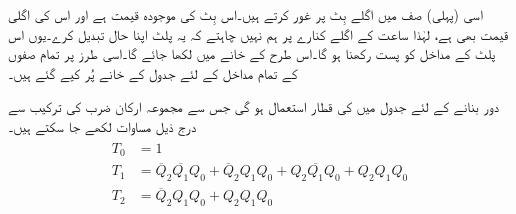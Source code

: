 اسی (پہلی) صف میں اگلے بِٹ  پر غور کرتے ہیں۔اس بِٹ کی موجودہ قیمت  ہے اور اس کی اگلی قیمت بھی  ہے، لہٰذا ساعت کے اگلے کنارے پر ہم نہیں چاہتے کہ یہ پلٹ اپنا حال تبدیل کرے۔یوں اس پلٹ کے مداخل  کو پست رکھنا ہو گا۔اس طرح  کے خانے میں  لکھا جائے گا۔اسی طرز پر تمام صفوں کے تمام مداخل کے لئے جدول کے خانے پُر کیے گئے ہیں۔


دور بنانے کے لئے جدول میں کی قطار استعمال ہو گی جس سے مجموعہ ارکان ضرب کی ترکیب سے درج ذیل مساوات لکھے جا سکتے ہیں۔
\begin{gather}
\begin{aligned}
T_0&=1\\
T_1&=\overline{Q}_2\overline{Q_1} Q_0+\overline{Q}_2 Q_1 Q_0+Q_2\overline{Q_1} Q_0+Q_2Q_1Q_0\\
T_2&=\overline{Q}_2 Q_1 Q_0+Q_2Q_1Q_0
\end{aligned}
\end{gather}
%

